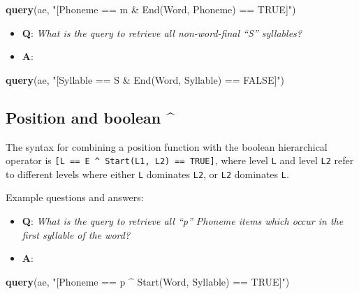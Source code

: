 \documentclass[]{book}
\newenvironment{Shaded}{\begin{snugshade}}{\end{snugshade}}
\newcommand{\KeywordTok}[1]{\textcolor[rgb]{0.13,0.29,0.53}{\textbf{#1}}}
\newcommand{\NormalTok}[1]{#1}
\newcommand{\StringTok}[1]{\textcolor[rgb]{0.31,0.60,0.02}{#1}}
\providecommand{\tightlist}{%
  \setlength{\itemsep}{0pt}\setlength{\parskip}{0pt}}
\begin{document}
\begin{Shaded}
\begin{Highlighting}[]
\KeywordTok{query}\NormalTok{(ae, }\StringTok{"[Phoneme == m & End(Word, Phoneme) == TRUE]"}\NormalTok{)}
\end{Highlighting}
\end{Shaded}

\begin{itemize}
\tightlist
\item
  \textbf{Q}: \emph{What is the query to retrieve all non-word-final ``S'' syllables?}
\item
  \textbf{A}:
\end{itemize}

\begin{Shaded}
\begin{Highlighting}[]
\KeywordTok{query}\NormalTok{(ae, }\StringTok{"[Syllable == S & End(Word, Syllable) == FALSE]"}\NormalTok{)}
\end{Highlighting}
\end{Shaded}

\hypertarget{position-and-boolean-1}{%
\subsection{Position and boolean \^{}}\label{position-and-boolean-1}}

The syntax for combining a position function with the boolean hierarchical operator is \texttt{{[}L\ ==\ E\ \^{}\ Start(L1,\ L2)\ ==\ TRUE{]}}, where level \texttt{L} and level \texttt{L2} refer to different levels where either \texttt{L} dominates \texttt{L2}, or \texttt{L2} dominates \texttt{L}.

Example questions and answers:

\begin{itemize}
\tightlist
\item
  \textbf{Q}: \emph{What is the query to retrieve all ``p'' Phoneme items which occur in the first syllable of the word?}
\item
  \textbf{A}:
\end{itemize}

\begin{Shaded}
\begin{Highlighting}[]
\KeywordTok{query}\NormalTok{(ae, }\StringTok{"[Phoneme == p ^ Start(Word, Syllable) == TRUE]"}\NormalTok{)}
\end{Highlighting}
\end{Shaded}
\end{document}
